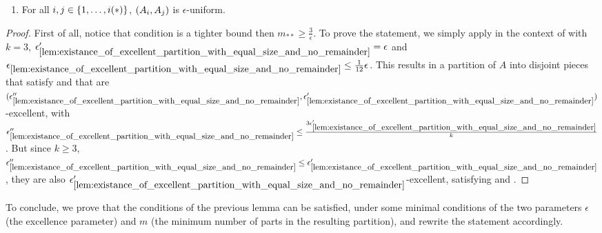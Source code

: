 \begin{lemma}[Corollary 5.15]
\begin{enumerate}[label=(\roman*), ref=\roman*]
            \item \label{itm:resume_of_all_conditions_for_excellent_partitions.iii}
                For all $i, j \in \{ 1, \dots, i(*) \}$, $( A_i, A_j )$ is $\epsilon$-uniform.
        \end{enumerate}
        \begin{proof}
            First of all, notice that condition 
            is a tighter bound then $m_{**} \geq \frac{3}{\epsilon}$.
            To prove the statement, we simply apply 
            in the context of  with $k = 3$,
            ${\epsilon'_{\ref{lem:existance_of_excellent_partition_with_equal_size_and_no_remainder}}} = \epsilon$
            and ${\epsilon_{\ref{lem:existance_of_excellent_partition_with_equal_size_and_no_remainder}}} \leq \frac{1}{12} \epsilon$.
            This results in a partition of $A$ into disjoint pieces that satisfy
             and that are
            $( {\epsilon''_{\ref{lem:existance_of_excellent_partition_with_equal_size_and_no_remainder}}},
                \epsilon'_{\ref{lem:existance_of_excellent_partition_with_equal_size_and_no_remainder}} )$-excellent,
            with ${\epsilon''_{\ref{lem:existance_of_excellent_partition_with_equal_size_and_no_remainder}}} \leq
                \frac{3 \epsilon'_{\ref{lem:existance_of_excellent_partition_with_equal_size_and_no_remainder}}}{k}$.
            But since $k \geq 3$, ${\epsilon''_{\ref{lem:existance_of_excellent_partition_with_equal_size_and_no_remainder}}} \leq
                \epsilon'_{\ref{lem:existance_of_excellent_partition_with_equal_size_and_no_remainder}}$, they are also
            $\epsilon'_{\ref{lem:existance_of_excellent_partition_with_equal_size_and_no_remainder}}$-excellent, satisfying
             and
            .
        \end{proof}
    \end{lemma}

    To conclude, we prove that the conditions of the previous lemma can be satisfied, under some minimal conditions
    of the two parameters $\epsilon$ (the excellence parameter) and $m$ (the minimum number of parts in the resulting
    partition), and rewrite the statement accordingly.


